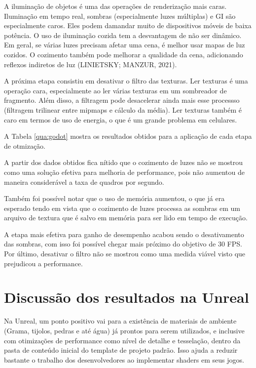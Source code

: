 A iluminação de objetos é uma das operações de renderização mais caras. Iluminação em tempo real, sombras (especialmente luzes múltiplas) e GI são especialmente caros. Eles podem damandar muito de dispositivos móveis de baixa potência. O uso de iluminação cozida tem a desvantagem de não ser dinâmico. Em geral, se várias luzes precisam afetar uma cena, é melhor usar mapas de luz cozidos. O cozimento também pode melhorar a qualidade da cena, adicionando reflexos indiretos de luz (LINIETSKY; MANZUR, 2021).

A próxima etapa consistiu em desativar o filtro das texturas. Ler texturas é uma operação cara, especialmente ao ler várias texturas em um sombreador de fragmento. Além disso, a filtragem pode desacelerar ainda mais esse processso (filtragem trilinear entre mipmaps e cálculo da média). Ler texturas também é caro em termos de uso de energia, o que é um grande problema em celulares.

A Tabela \ref{qua:godot} mostra os resultados obtidos para a aplicação de cada etapa de otmização.



A partir dos dados obtidos fica nítido que o cozimento de luzes não se mostrou como uma solução efetiva para melhoria de performance, pois não aumentou de maneira considerável a taxa de quadros por segundo. 

Também foi possível notar que o uso de memória aumentou, o que já era esperado tendo em vista que o cozimento de luzes processa as sombras em um arquivo de textura que é salvo em memória para ser lido em tempo de execução. 

A etapa mais efetiva para ganho de desempenho acabou sendo o desativamento das sombras, com isso foi possível chegar mais próximo do objetivo de 30 FPS. Por último, desativar o filtro não se mostrou como uma medida viável visto que prejudicou a performance.

\section{Discussão dos resultados na Unreal}
\label{sec:resultado-unreal}

Na Unreal, um ponto positivo vai para a existência de materiais de ambiente (Grama, tijolos, pedras e até água) já prontos para serem utilizados, e inclusive com otimizações de performance como nível de detalhe e tesselação, dentro da pasta de conteúdo inicial do template de projeto padrão. Isso ajuda a reduzir bastante o trabalho dos desenvolvedores ao implementar shaders em seus jogos.

